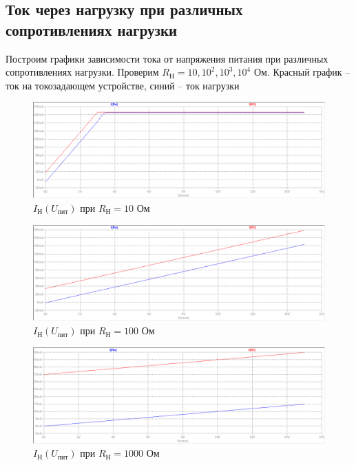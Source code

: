 \documentclass[a4paper, 12pt]{article}
\begin{document}
    \subsection{Ток через нагрузку при различных сопротивлениях нагрузки}
    Построим графики зависимости тока от напряжения питания при различных сопротивлениях нагрузки.
    Проверим $R_\text{Н}=10,10^2,10^3,10^4$ Ом. Красный график -- ток на токозадающем устройстве,
    синий -- ток нагрузки
    \begin{figure}[H]
        \centering
        \includegraphics[scale=0.46]{3task_Iн(Vпит)_Rн10.png}
        \captionsetup{skip=0pt}
        \caption{$I_\text{Н}\left( U_\text{пит} \right)$ при $R_\text{Н}=10$ Ом}
        \label{fig:3task_InVlR10}
    \end{figure}
    \begin{figure}[H]
        \centering
        \includegraphics[scale=0.46]{3task_Iн(Vпит)_Rн100.png}
        \captionsetup{skip=0pt}
        \caption{$I_\text{Н}\left( U_\text{пит} \right)$ при $R_\text{Н}=100$ Ом}
        \label{fig:3task_InVlR100}
    \end{figure}
    \begin{figure}[H]
        \centering
        \includegraphics[scale=0.46]{3task_Iн(Vпит)_Rн1000.png}
        \captionsetup{skip=0pt}
        \caption{$I_\text{Н}\left( U_\text{пит} \right)$ при $R_\text{Н}=1000$ Ом}
        \label{fig:3task_InVlR1000}
    \end{figure}
\end{document}
